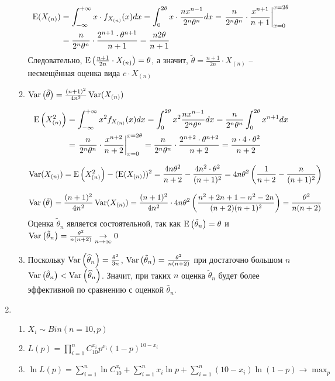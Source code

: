 \begin{enumerate}
\begin{enumerate}
\begin{align*}
\operatorname{E}(X_{(n)}) &= \int_{-\infty}^{+\infty} x \cdot f_{X_{(n)}} (x) dx =  \int_{0}^{2\theta}	x \cdot \frac{nx^{n-1}}{2^n \theta^n} dx = \left. \frac{n}{2^n \theta^n} \cdot \frac{x^{n+1}}{n+1} \right|_{x=0}^{x=2\theta} \\
&= \frac{n}{2^n \theta^n}  \cdot \frac{2^{n+1}\cdot \theta^{n+1}}{n+1} = \frac{n2\theta}{n+1}
\end{align*}
Следовательно, $\operatorname{E} \left(\frac{n+1}{2n} \cdot X_{(n)}\right) = \theta$, а значит, $\tilde{\theta} = \frac{n+1}{2n} \cdot X_{(n)}$ – несмещённая оценка вида $c \cdot  X_{(n)}$
\item $\operatorname{Var}\left(\tilde{\theta}\right) = \frac{(n+1)^2}{4n^2} \operatorname{Var}(X_{(n)})$

\begin{align*}
\operatorname{E}\left(X_{(n)}^2\right) &= \int_{-\infty}^{+\infty} x^2 f_{X_{(n)}} (x) dx = \int_{0}^{2\theta} x^2 \frac{nx^{n-1}}{2^n \theta^n}  dx = \frac{n}{2^n \theta^n}  \int_{0}^{2\theta} x^{n+1} dx \\
&= \left. \frac{n}{2^n \theta^n} \cdot \frac{x^{n+2}}{n+2} \right|_{x=0}^{x=2\theta} = \frac{n}{2^n \theta^n} \cdot  \frac{2^{n+2}\cdot \theta^{n+2}}{n+2} = \frac{n\cdot4\cdot\theta^2}{n+2}
\end{align*}

\[
\operatorname{Var}(X_{(n)}) = \operatorname{E}\left(X_{(n)}^2\right)  - (\operatorname{E}(X_{(n)}))^2 = \frac{4n\theta^2}{n+2} - \frac{4 n^2 \cdot \theta^2}{(n+1)^2} = 4n\theta^2 \left(\frac{1}{n+2} - \frac{n}{(n+1)^2}\right)
\]

\[
\operatorname{Var}\left(\tilde{\theta}\right) = \frac{(n+1)^2}{4n^2} \operatorname{Var}(X_{(n)}) = \frac{(n+1)^2}{4n^2}  \cdot 4n\theta^2 \left(\frac{n^2+2n+1 - n^2-2n}{(n+2)(n+1)^2} \right) = \frac{\theta^2}{n(n+2)}
\]
Оценка $\tilde{\theta}_n$ является состоятельной, так как
$\operatorname{E}\left(\tilde{\theta}_n\right) = \theta$ и
$\operatorname{Var}\left(\tilde{\theta}_n\right) = \frac{\theta^2}{n(n+2)} \underset{n \to \infty}{\to} 0$
\item  Поскольку $\operatorname{Var}\left(\widehat{\theta}_n\right) = \frac{\theta^2}{3n}$,
$\operatorname{Var}\left(\tilde{\theta}_n\right) = \frac{\theta^2}{n(n+2)}$ при достаточно большом $n$
$\operatorname{Var}\left(\tilde{\theta}_n\right) < \operatorname{Var}\left(\widehat{\theta}_n\right)$.
Значит, при таких $n$ оценка $\tilde{\theta}_n$ будет более эффективной по сравнению
с оценкой $\widehat{\theta}_n$.
\end{enumerate}

\item
\begin{enumerate}
\item $X_i \sim Bin (n=10, p)$
\item $L(p)  = \prod_{i=1}^{n} C_{10}^{x_i} p^{x_i} (1-p)^{10-x_i}$
\item $\ln L(p) = \sum_{i=1}^{n} \ln C_{10}^{x_i} + \sum_{i=1}^n x_i \ln p + \sum_{i=1}^{n} (10-x_i)\ln (1-p) \to \max_p$


\end{enumerate}
\end{enumerate}
